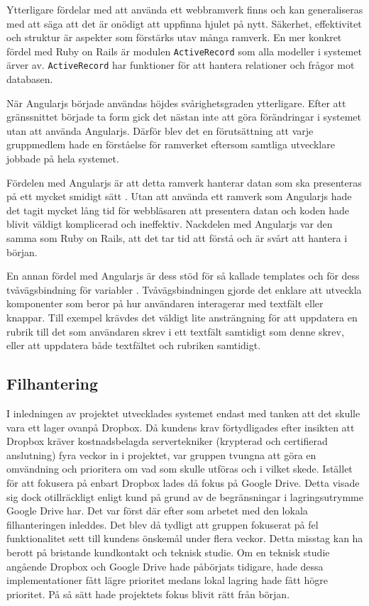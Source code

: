 Ytterligare fördelar med att använda ett webbramverk finns och kan
generaliseras med att säga att det är onödigt att uppfinna hjulet på nytt.
Säkerhet, effektivitet och struktur är aspekter som förstärks utav många
ramverk. En mer konkret fördel med Ruby on Rails är modulen
\texttt{ActiveRecord} som alla modeller i systemet ärver av.
\texttt{ActiveRecord} har funktioner för att hantera relationer och frågor mot
databasen.

När Angularjs började användas höjdes svårighetsgraden ytterligare. Efter att
gränssnittet började ta form gick det nästan inte att göra förändringar i
systemet utan att använda Angularjs. Därför blev det en förutsättning att varje
gruppmedlem hade en förståelse för ramverket eftersom samtliga utvecklare
jobbade på hela systemet.

Fördelen med Angularjs är att detta ramverk hanterar datan som ska presenteras
på ett mycket smidigt sätt \cite{angularjs}. Utan att använda ett ramverk som
Angularjs hade det tagit mycket lång tid för webbläsaren att presentera datan
och koden hade blivit väldigt komplicerad och ineffektiv. Nackdelen med
Angularjs var den samma som Ruby on Rails, att det tar tid att förstå och är
svårt att hantera i början.

En annan fördel med Angularjs är dess stöd för så kallade templates och för
dess tvåvägsbindning för variabler \cite{angularjs}. Tvåvägsbindningen gjorde
det enklare att utveckla komponenter som beror på hur användaren interagerar
med textfält eller knappar. Till exempel krävdes det väldigt lite ansträngning
för att uppdatera en rubrik till det som användaren skrev i ett textfält
samtidigt som denne skrev, eller att uppdatera både textfältet och rubriken
samtidigt.

\subsection{Filhantering}

I inledningen av projektet utvecklades systemet endast med tanken att det
skulle vara ett lager ovanpå Dropbox. Då kundens krav förtydligades efter
insikten att Dropbox kräver kostnadsbelagda servertekniker (krypterad och
certifierad anslutning) fyra veckor in i projektet, var gruppen tvungna att
göra en omvändning och prioritera om vad som skulle utföras och i vilket skede.
Istället för att fokusera på enbart Dropbox lades då fokus på Google Drive.
Detta visade sig dock otillräckligt enligt kund på grund av de begränsningar i
lagringsutrymme Google Drive har. Det var först där efter som arbetet med den
lokala filhanteringen inleddes. Det blev då tydligt att gruppen fokuserat på
fel funktionalitet sett till kundens önskemål under flera veckor. Detta misstag
kan ha berott på bristande kundkontakt och teknisk studie. Om en teknisk studie
angående Dropbox och Google Drive hade påbörjats tidigare, hade dessa
implementationer fått lägre prioritet medans lokal lagring hade fått högre
prioritet. På så sätt hade projektets fokus blivit rätt från början.

